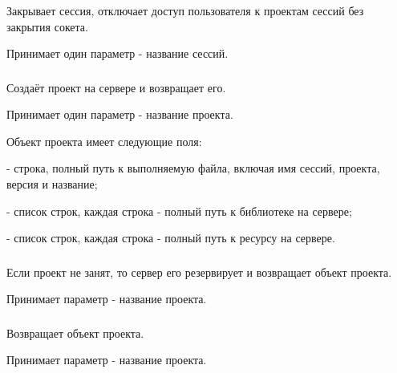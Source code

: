 \subsubsection{}

Закрывает сессия, отключает доступ пользователя к проектам сессий без закрытия сокета.

Принимает один параметр  - название сессий.

\subsubsection{}

Создаёт проект на сервере и возвращает его.

Принимает один параметр  - название проекта.

Объект проекта имеет следующие поля:

\begin{icItems}
	\item {} - строка, полный путь к выполняемую файла, включая имя сессий, проекта, версия и название;
	\item {} - список строк, каждая строка - полный путь к библиотеке на сервере;
	\item {} - список строк, каждая строка - полный путь к ресурсу на сервере.
\end{icItems}

\subsubsection{}

Если проект не занят, то сервер его резервирует и возвращает объект проекта.

Принимает параметр  - название проекта.

\subsubsection{}

Возвращает объект проекта.

Принимает параметр  - название проекта.

\subsubsection{}

